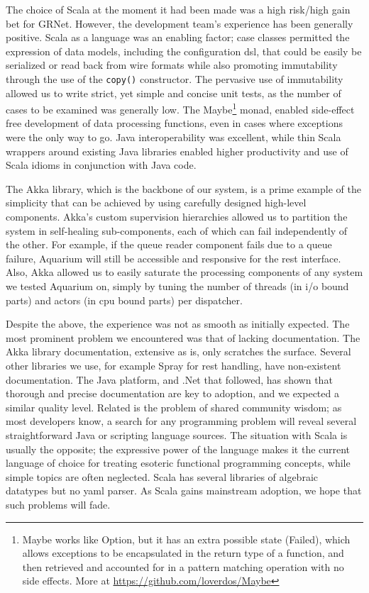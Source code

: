 \documentclass[preprint,10pt]{sigplanconf}
\begin{document}
The choice of Scala at the moment it had been made was a high risk/high gain
bet for GRNet. However, the development team's experience has been generally
positive. Scala as a language was an enabling factor; case classes permitted
the expression of data models, including the configuration {\sc dsl}, that
could be easily be serialized or read back from wire formats while also
promoting immutability through the use of the \texttt{copy()} constructor. The
pervasive use of immutability allowed us to write strict, yet simple and
concise unit tests, as the number of cases to be examined was generally low.
The \textsf{Maybe}\footnote{\textsf{Maybe} works like \textsf{Option}, but it
has an extra possible state (\textsf{Failed}), which allows exceptions to be
encapsulated in the return type of a function, and then retrieved and accounted
for in a pattern matching operation with no side effects. More at
\url{https://github.com/loverdos/Maybe}} monad, enabled side-effect free
development of data processing functions, even in cases where exceptions were
the only way to go. Java interoperability was excellent, while thin Scala
wrappers around existing Java libraries enabled higher productivity and use of
Scala idioms in conjunction with Java code.

The Akka library, which is the backbone of our system, is a prime example of 
the simplicity that can be achieved by using carefully designed high-level
components. Akka's custom supervision hierarchies allowed us to partition the
system in self-healing sub-components, each of which can fail independently
of the other. For example, if the queue reader component fails due to a queue
failure, Aquarium will still be accessible and responsive for the {\sc rest}
interface. Also, Akka allowed us to easily saturate the processing components
of any system we tested Aquarium on, simply by tuning the number of threads (in
{\sc i/o} bound parts) and actors (in {\sc cpu} bound parts) per dispatcher. 

Despite the above, the experience was not as smooth as initially expected. The
most prominent problem we encountered was that of lacking documentation. The
Akka library documentation, extensive as is, only scratches the surface.
Several other libraries we use, for example Spray for {\sc rest} handling, have
non-existent documentation. The Java platform, and .Net that followed, has
shown that thorough and precise documentation are key to adoption, and we
expected a similar quality level. Related is the problem of shared community
wisdom; as most developers know, a search for any programming problem will
reveal several straightforward Java or scripting language sources. The
situation with Scala is usually the opposite; the expressive power of the
language makes it the current language of choice for treating esoteric
functional programming concepts, while simple topics are often neglected. Scala
has several libraries of algebraic datatypes but no {\sc yaml} parser. As Scala
gains mainstream adoption, we hope that such problems will fade.
\end{document}

